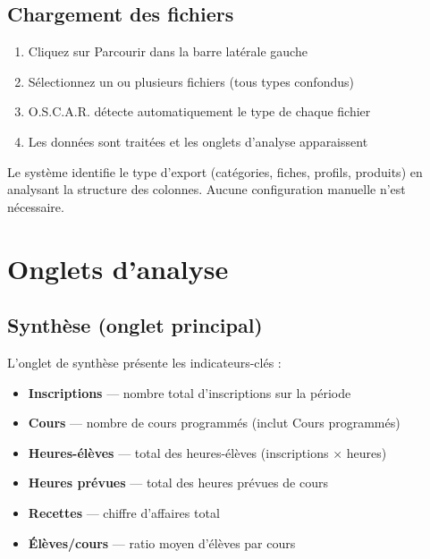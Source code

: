 \documentclass[12pt,a4paper,twoside]{article}
\begin{document}
\subsection{Chargement des fichiers}

\begin{enumerate}[leftmargin=2em]
  \item Cliquez sur \og{}Parcourir\fg{} dans la barre lat\'{e}rale gauche
  \item S\'{e}lectionnez un ou plusieurs fichiers (tous types confondus)
  \item O.S.C.A.R. d\'{e}tecte automatiquement le type de chaque fichier
  \item Les donn\'{e}es sont trait\'{e}es et les onglets d'analyse apparaissent
\end{enumerate}

\begin{infobox}
Le syst\`{e}me identifie le type d'export (cat\'{e}gories, fiches, profils, produits) en analysant la structure des colonnes. Aucune configuration manuelle n'est n\'{e}cessaire.
\end{infobox}

\section{Onglets d'analyse}

\subsection{Synth\`{e}se (onglet principal)}

L'onglet de synth\`{e}se pr\'{e}sente les indicateurs-cl\'{e}s :

\begin{itemize}[leftmargin=2em]
  \item \textbf{Inscriptions} --- nombre total d'inscriptions sur la p\'{e}riode
  \item \textbf{Cours} --- nombre de cours programm\'{e}s (inclut \og{}Cours programm\'{e}s\fg{})
  \item \textbf{Heures-\'{e}l\`{e}ves} --- total des heures-\'{e}l\`{e}ves (inscriptions $\times$ heures)
  \item \textbf{Heures pr\'{e}vues} --- total des heures pr\'{e}vues de cours
  \item \textbf{Recettes} --- chiffre d'affaires total
  \item \textbf{\'{E}l\`{e}ves/cours} --- ratio moyen d'\'{e}l\`{e}ves par cours
\end{itemize}
\end{document}
